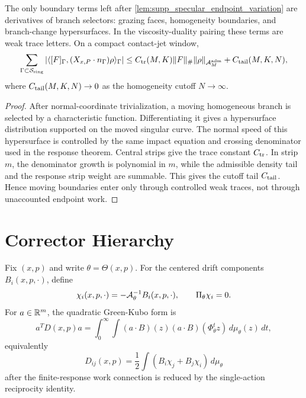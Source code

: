 \begin{proposition}
\label{prop:supp_moving_branch_boundary_ledger}
The only boundary terms left after \cref{lem:supp_specular_endpoint_variation}
are derivatives of branch selectors: grazing faces, homogeneity boundaries,
and branch-change hypersurfaces.  In the viscosity-duality pairing these terms
are weak trace letters.  On a compact contact-jet window,
\[
  \sum_{\Gamma\subset\mathcal S_{\rm sing}}
  |\langle [F]_\Gamma,(X_{x,P}\cdot n_\Gamma)\rho\rangle_\Gamma|
  \le
  C_{\rm tr}(M,K)\|F\|_{\#}\|\rho\|_{\mathcal A^{\mathrm{adm}}_M}
  +C_{\rm tail}(M,K,N),
\]
where \(C_{\rm tail}(M,K,N)\to0\) as the homogeneity cutoff \(N\to\infty\).
\end{proposition}

\begin{proof}
After normal-coordinate trivialization, a moving homogeneous branch is selected
by a characteristic function.  Differentiating it gives a hypersurface
distribution supported on the moved singular curve.  The normal speed of this
hypersurface is controlled by the same impact equation and crossing denominator
used in the response theorem.  Central strips give the trace constant
\(C_{\rm tr}\).  In strip \(m\), the denominator growth is polynomial in \(m\),
while the admissible density tail and the response strip weight are summable.
This gives the cutoff tail \(C_{\rm tail}\).  Hence moving boundaries enter
only through controlled weak traces, not through unaccounted endpoint work.
\end{proof}

\section{Corrector Hierarchy}

\begin{definition}
\label{def:supp_first_corrector_gk}
Fix \((x,p)\) and write \(\theta=\Theta(x,p)\).  For the centered drift
components \(B_i(x,p,\cdot)\), define
\[
  \chi_i(x,p,\cdot)
  =
  -\mathcal A_\theta^{-1}B_i(x,p,\cdot),
  \qquad
  \Pi_\theta\chi_i=0.
\]
For \(a\in\mathbb R^m\), the quadratic Green-Kubo form is
\[
  a^T D(x,p)a
  =
  \int_0^\infty
  \int (a\cdot B)(z)(a\cdot B)(\Phi_\theta^t z)
  \,d\mu_\theta(z)\,dt,
\]
equivalently
\[
  D_{ij}(x,p)
  =
  \frac12\int (B_i\chi_j+B_j\chi_i)\,d\mu_\theta
\]
after the finite-response work connection is reduced by the single-action
reciprocity identity.
\end{definition}

